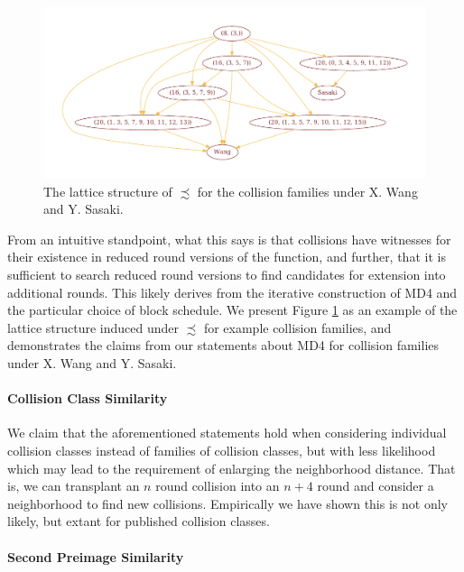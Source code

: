 \documentclass[conference]{IEEEtran}
\begin{document}
\begin{figure}
\begin{center}
\includegraphics[width=\textwidth]{Figs/lattice.pdf}
\caption{The lattice structure of $\precsim$ for the collision
  families under X. Wang and Y. Sasaki.}
\label{Fig:PrecSim}
\end{center}
\end{figure}

From an intuitive standpoint, what this says is that collisions have
witnesses for their existence in reduced round versions of the function, and
further, that it is sufficient to search reduced round versions to find
candidates for extension into additional rounds. This likely derives from
the iterative construction of MD4 and the particular choice of block schedule.
We present Figure \ref{Fig:PrecSim} as an example of the lattice structure
induced under $\precsim$ for example collision families, and
demonstrates the claims from our statements about MD4 for collision
families under X. Wang and Y. Sasaki.

\paragraph{Collision Class Similarity}

We claim that the aforementioned statements hold when considering individual
collision classes instead of families of collision classes, but with less
likelihood which may lead to the requirement of enlarging the
neighborhood distance. That is, we can transplant an $n$ round collision into an $n+4$
round and consider a neighborhood to find new collisions.  Empirically
we have shown this is not only likely, but extant for published
collision classes.

\paragraph{Second Preimage Similarity}
\end{document}
